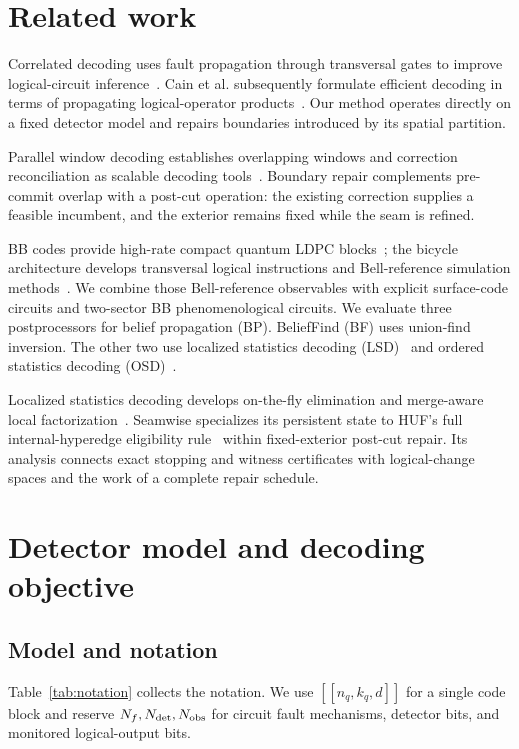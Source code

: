 \documentclass[10pt,letterpaper,twocolumn]{article}
\begin{document}
\section{Related work}
Correlated decoding uses fault propagation through transversal gates to improve logical-circuit inference~\cite{cain}. Cain et al. subsequently formulate efficient decoding in terms of propagating logical-operator products~\cite{fast}. Our method operates directly on a fixed detector model and repairs boundaries introduced by its spatial partition.

Parallel window decoding establishes overlapping windows and correction reconciliation as scalable decoding tools~\cite{window}. Boundary repair complements pre-commit overlap with a post-cut operation: the existing correction supplies a feasible incumbent, and the exterior remains fixed while the seam is refined.

BB codes provide high-rate compact quantum LDPC blocks~\cite{bb,bbpre}; the bicycle architecture develops transversal logical instructions and Bell-reference simulation methods~\cite{tour}. We combine those Bell-reference observables with explicit surface-code circuits and two-sector BB phenomenological circuits. We evaluate three postprocessors for belief propagation (BP). BeliefFind (BF) uses union-find inversion. The other two use localized statistics decoding (LSD)~\cite{lsd} and ordered statistics decoding (OSD)~\cite{osd}.

Localized statistics decoding develops on-the-fly elimination and merge-aware local factorization~\cite{lsd}. Seamwise specializes its persistent state to HUF's full internal-hyperedge eligibility rule~\cite{cain} within fixed-exterior post-cut repair. Its analysis connects exact stopping and witness certificates with logical-change spaces and the work of a complete repair schedule.

\section{Detector model and decoding objective}
\subsection{Model and notation}
Table~\ref{tab:notation} collects the notation. We use $[[n_q,k_q,d]]$ for a single code block and reserve $N_f,N_{\rm det},N_{\rm obs}$ for circuit fault mechanisms, detector bits, and monitored logical-output bits.
\end{document}
